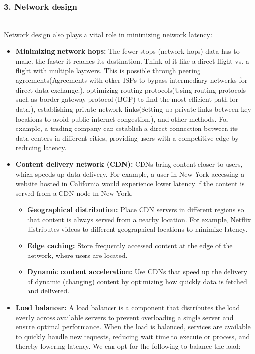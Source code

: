 \subsubsection{3. Network design}\label{98Gd-tCTFIIpWOsIF_6Te}
\\
Network design also plays a vital role in minimizing network latency:

\begin{itemize}
\item
\protect{}\label{8UNciyEdP-3pnLyC62I7-}
\textbf{Minimizing network hops:} The fewer stops (network hops) data has to make, the faster it reaches its destination. Think of it like a direct flight vs. a flight with multiple layovers. This is possible through peering agreements(Agreements with other ISPs to bypass intermediary networks for direct data exchange.), optimizing routing protocols(Using routing protocols such as border gateway protocol (BGP) to find the most efficient path for data.), establishing private network links(Setting up private links between key locations to avoid public internet congestion.), and other methods. For example, a trading company can establish a direct connection between its data centers in different cities, providing users with a competitive edge by reducing latency.
\item
\protect{}\label{nC3fMKAtb_fJAqDIL99ZK}
\textbf{Content delivery network (CDN):} CDNs bring content closer to users, which speeds up data delivery. For example, a user in New York accessing a website hosted in California would experience lower latency if the content is served from a CDN node in New York.

\begin{itemize}
\item
\textbf{Geographical distribution:} Place CDN servers in different regions so that content is always served from a nearby location. For example, Netflix distributes videos to different geographical locations to minimize latency.
\item
\textbf{Edge caching:} Store frequently accessed content at the edge of the network, where users are located.
\item
\textbf{Dynamic content acceleration:} Use CDNs that speed up the delivery of dynamic (changing) content by optimizing how quickly data is fetched and delivered.
\end{itemize}
\item
\protect{}\label{qrKlR8KcVZp_lVszQ4YiW}
\textbf{Load balancer:} A load balancer is a component that distributes the load evenly across available servers to prevent overloading a single server and ensure optimal performance. When the load is balanced, services are available to quickly handle new requests, reducing wait time to execute or process, and thereby lowering latency. We can opt for the following to balance the load:


\end{itemize}
